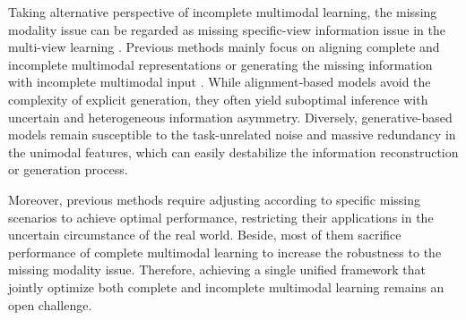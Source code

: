 \documentclass{article}
\begin{document}
Taking alternative perspective of incomplete multimodal learning, the missing modality issue can be regarded as missing specific-view information issue in the multi-view learning \cite{tang2024incomplete}. Previous methods mainly focus on aligning complete and incomplete multimodal representations \cite{zhang2022cpmnet,poklukar2022geometric} or generating the missing information with incomplete multimodal input \cite{zhao2021missing,lian2023gcnet,wang2023incomplete}. While alignment‐based models avoid the complexity of explicit generation, they often yield suboptimal inference with uncertain and heterogeneous information asymmetry. Diversely, generative-based models remain susceptible to the task-unrelated noise and massive redundancy in the unimodal features, which can easily destabilize the information reconstruction or generation process. 

Moreover, previous methods require adjusting according to specific missing scenarios to achieve optimal performance, restricting their applications in the uncertain circumstance of the real world. Beside, most of them sacrifice performance of complete multimodal learning to increase the robustness to the missing modality issue. Therefore, achieving a single unified framework that jointly optimize both complete and incomplete multimodal learning remains an open challenge.
\end{document}
